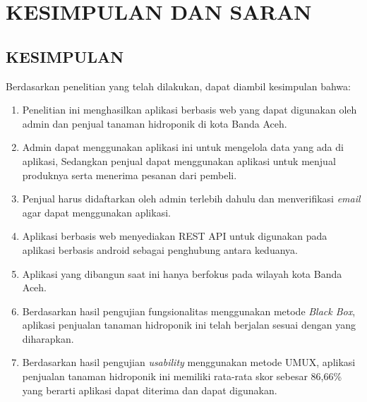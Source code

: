 \fancyhf{} 
\fancyfoot[C]{\thepage}
\chapter{KESIMPULAN DAN SARAN}

\section{\uppercase{KESIMPULAN}}
Berdasarkan penelitian yang telah dilakukan, dapat diambil kesimpulan bahwa:
\begin{enumerate}
    \item Penelitian ini menghasilkan aplikasi berbasis web yang dapat digunakan oleh admin dan penjual tanaman hidroponik di kota Banda Aceh.
    \item Admin dapat menggunakan aplikasi ini untuk mengelola data yang ada di aplikasi, Sedangkan penjual dapat menggunakan aplikasi untuk menjual produknya serta menerima pesanan dari pembeli.
    \item Penjual harus didaftarkan oleh admin terlebih dahulu dan menverifikasi \textit{email} agar dapat menggunakan aplikasi.
    \item Aplikasi berbasis web menyediakan REST API untuk digunakan pada aplikasi berbasis android sebagai penghubung antara keduanya.
    \item Aplikasi yang dibangun saat ini hanya berfokus pada wilayah kota Banda Aceh.
    \item Berdasarkan hasil pengujian fungsionalitas menggunakan metode \textit{Black Box}, aplikasi penjualan tanaman hidroponik ini telah berjalan sesuai dengan yang diharapkan.
    \item Berdasarkan hasil pengujian \textit{usability} menggunakan metode UMUX, aplikasi penjualan tanaman hidroponik ini memiliki rata-rata skor sebesar 86,66\% yang berarti aplikasi dapat diterima dan dapat digunakan.
\end{enumerate}

